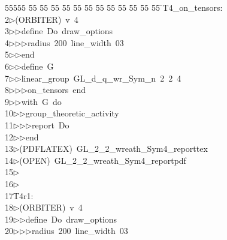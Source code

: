 %
%
\begin{tabbing}
55555 \= 55 \= 55 \= 55 \= 55 \= 55 \= 55 \= 55 \= 55 \= 55 \= 55 \= 55 \= 55 \= \>T4\_on\_tensors:\\[0pt]
2\>$\triangleright$\>(ORBITER)\ v\ 4\ \\[0pt]
3\>$\triangleright$\>$\triangleright$\>define\ Do\ draw\_options\ \\[0pt]
4\>$\triangleright$\>$\triangleright$\>$\triangleright$\>radius\ 200\ line\_width\ 03\ \\[0pt]
5\>$\triangleright$\>$\triangleright$\>end\ \\[0pt]
6\>$\triangleright$\>$\triangleright$\>define\ G\ \\[0pt]
7\>$\triangleright$\>$\triangleright$\>linear\_group\ GL\_d\_q\_wr\_Sym\_n\ 2\ 2\ 4\ \\[0pt]
8\>$\triangleright$\>$\triangleright$\>$\triangleright$\>on\_tensors\ end\ \\[0pt]
9\>$\triangleright$\>$\triangleright$\>with\ G\ do\ \\[0pt]
10\>$\triangleright$\>$\triangleright$\>group\_theoretic\_activity\ \\[0pt]
11\>$\triangleright$\>$\triangleright$\>$\triangleright$\>report\ Do\ \\[0pt]
12\>$\triangleright$\>$\triangleright$\>end\\[0pt]
13\>$\triangleright$\>(PDFLATEX)\ GL\_2\_2\_wreath\_Sym4\_reporttex\\[0pt]
14\>$\triangleright$\>(OPEN)\ GL\_2\_2\_wreath\_Sym4\_reportpdf\\[0pt]
15\>$\triangleright$\>\\[0pt]
16\>$\triangleright$\>\\[0pt]
17\>T4r1:\\[0pt]
18\>$\triangleright$\>(ORBITER)\ v\ 4\ \\[0pt]
19\>$\triangleright$\>$\triangleright$\>define\ Do\ draw\_options\ \\[0pt]
20\>$\triangleright$\>$\triangleright$\>$\triangleright$\>radius\ 200\ line\_width\ 03\ \\[0pt]

\end{tabbing}
